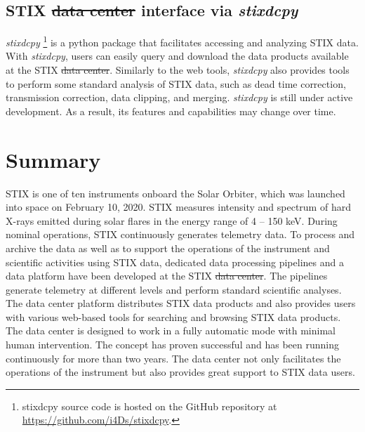\documentclass[referee]{aa} %
\providecommand{\DIFaddtex}[1]{{\protect\color{blue}\uwave{#1}}} %
\providecommand{\DIFdeltex}[1]{{\protect\color{red}\sout{#1}}}                      %
\providecommand{\DIFaddbegin}{} %
\providecommand{\DIFaddend}{} %
\providecommand{\DIFdelbegin}{} %
\providecommand{\DIFdelend}{} %
\providecommand{\DIFadd}[1]{\texorpdfstring{\DIFaddtex{#1}}{#1}} %
\providecommand{\DIFdel}[1]{\texorpdfstring{\DIFdeltex{#1}}{}} %
\newcommand{\DIFscaledelfig}{0.5}
\newlength{\DIFdelgraphicswidth} %
\newlength{\DIFdelgraphicsheight} %
\newcommand{\DIFaddincludegraphics}[2][]{{\color{blue}\fbox{\DIFOincludegraphics[#1]{#2}}}} %
\newcommand{\DIFdelincludegraphics}[2][]{%
\sbox{\DIFdelgraphicsbox}{\DIFOincludegraphics[#1]{#2}}%
\settoboxwidth{\DIFdelgraphicswidth}{\DIFdelgraphicsbox} %
\settoboxtotalheight{\DIFdelgraphicsheight}{\DIFdelgraphicsbox} %
\scalebox{\DIFscaledelfig}{%
\parbox[b]{\DIFdelgraphicswidth}{\usebox{\DIFdelgraphicsbox}\\[-\baselineskip] \rule{\DIFdelgraphicswidth}{0em}}\llap{\resizebox{\DIFdelgraphicswidth}{\DIFdelgraphicsheight}{%
\setlength{\unitlength}{\DIFdelgraphicswidth}%
\begin{picture}(1,1)%
\thicklines\linethickness{2pt} %
{\color[rgb]{1,0,0}\put(0,0){\framebox(1,1){}}}%
{\color[rgb]{1,0,0}\put(0,0){\line( 1,1){1}}}%
{\color[rgb]{1,0,0}\put(0,1){\line(1,-1){1}}}%
\end{picture}%
}\hspace*{3pt}}} %
} %
\DeclareRobustCommand{\DIFaddbegin}{\DIFOaddbegin \let\includegraphics\DIFaddincludegraphics} %
\DeclareRobustCommand{\DIFaddend}{\DIFOaddend \let\includegraphics\DIFOincludegraphics} %
\DeclareRobustCommand{\DIFdelbegin}{\DIFOdelbegin \let\includegraphics\DIFdelincludegraphics} %
\DeclareRobustCommand{\DIFdelend}{\DIFOaddend \let\includegraphics\DIFOincludegraphics} %
\begin{document}
\subsection{STIX \DIFdelbegin \DIFdel{data center }\DIFdelend \DIFaddbegin \DIFadd{Data Center }\DIFaddend interface via  {\it stixdcpy}}
{\it stixdcpy} \footnote{stixdcpy source code is hosted on the GitHub repository at \url{https://github.com/i4Ds/stixdcpy}.} is a python package that facilitates accessing and analyzing STIX data. 
With {\it stixdcpy}, users can easily query and download the data products available at the STIX \DIFdelbegin \DIFdel{data center}\DIFdelend \DIFaddbegin \DIFadd{Data Center}\DIFaddend .
Similarly to the web tools, {\it stixdcpy} also provides tools to perform some standard analysis of STIX data, such as dead time correction, transmission correction, data clipping, and merging. 
{\it stixdcpy} is still under active development. 
As a result, its features and 
capabilities may change over time.  

\section{Summary}
\label{sec:summary}
STIX is one of ten instruments onboard the Solar Orbiter, 
which was launched into space on February 10, 2020.
 STIX measures  
intensity and spectrum of hard X-rays emitted during solar flares
in the energy range of 4 -- 150 keV.  
 During nominal operations, STIX continuously generates telemetry data. 
 To process and archive the data as well as to support the operations of the
 instrument and scientific activities using STIX data, 
 dedicated data processing pipelines and a data platform have been 
 developed at the STIX \DIFdelbegin \DIFdel{data center}\DIFdelend \DIFaddbegin \DIFadd{Data Center}\DIFaddend .
 The pipelines generate telemetry at different levels and perform standard scientific analyses.  The data center platform distributes STIX data products and also provides users 
 with various web-based tools for searching and browsing STIX data products. 
  The data center is designed to work in a 
 fully automatic mode with minimal human intervention. The concept has proven successful 
 and has been running continuously for more than two years.
The data center not only facilitates the operations of the instrument but also provides great support to STIX data users.





\end{document}
